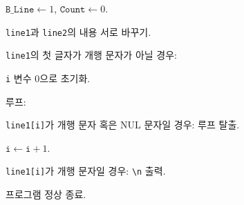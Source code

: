 \documentclass[runningheads]{../../../llncs}
\begin{document}
\begin{algorithm}
\begin{algorithm}
\begin{algorithm}
						\item $\texttt{B_Line} \leftarrow 1$, $\texttt{Count} \leftarrow 0$.
					\end{algorithm}
				\item \texttt{line1}과 \texttt{line2}의 내용 서로 바꾸기.
			\end{algorithm}
	\item \texttt{line1}의 첫 글자가 개행 문자가 아닐 경우:
			\begin{algorithm}
				\item \texttt{i} 변수 0으로 초기화.
				\item 루프:
					\begin{algorithm}
						\item \texttt{line1[i]}가 개행 문자 혹은 NUL 문자일 경우: 루프 탈출.
						\item $\texttt{i} \leftarrow \texttt{i} + 1$.
					\end{algorithm}
				\item \texttt{line1[i]}가 개행 문자일 경우: \texttt{\textbackslash{}n} 출력.
			\end{algorithm}
	\item 프로그램 정상 종료.
\end{algorithm}
\end{document}
